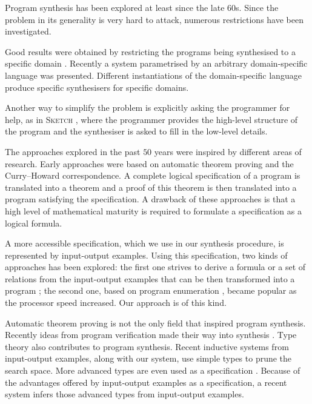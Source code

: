 Program synthesis has been explored at least since the late 60s. Since the problem in its generality is very hard to attack, numerous restrictions have been investigated.

Good results were obtained by restricting the programs being synthesised to a specific domain \cite{Fischer:2003:ASG:967842.967845,Frigo98fftw:an,Thies2002,Gulwani:2011:ASP:1926385.1926423,Gulwani:2011:SGC:1993498.1993505}. Recently a system parametrised by an arbitrary domain-specific language \cite{Perelman:2014:TS:2594291.2594297} was presented. Different instantiations of the domain-specific language produce specific synthesisers for specific domains.

Another way to simplify the problem is explicitly asking the programmer for help, as in \textsc{Sketch} \cite{Solar-Lezama:2006:CSF:1168857.1168907}, where the programmer provides the high-level structure of the program and the synthesiser is asked to fill in the low-level details.

The approaches explored in the past $50$ years were inspired by different areas of research.
Early approaches \cite{Manna:1980:DAP:357084.357090} were based on automatic theorem proving and the Curry–Howard correspondence. A complete logical specification of a program is translated into a theorem and a proof of this theorem is then translated into a program satisfying the specification.
A drawback of these approaches is that a high level of mathematical maturity is required to formulate a specification as a logical formula.

A more accessible specification, which we use in our synthesis procedure, is represented by input-output examples. Using this specification, two kinds of approaches has been explored: the first one strives to derive a formula or a set of relations from the input-output examples that can be then transformed into a program \cite{Summers:1977:MLP:321992.322002,Kitzelmann:2009:AIF:1530575.1530582,Jha:2010:OCP:1806799.1806833}; the second one, based on program enumeration  \cite{LambdaSquarePaper,EscherPaper,MythPaper}, became popular as the processor speed increased. Our approach is of this kind.

Automatic theorem proving is not the only field that inspired program synthesis. Recently ideas from program verification made their way into synthesis \cite{LeonPaper,DBLP:journals/corr/InalaQLS15,Kuncak:2010:CFS:1806596.1806632}. Type theory also contributes to program synthesis. Recent inductive systems from input-output examples, \cite{LambdaSquarePaper,MythPaper} along with our system, use simple types to prune the search space. More advanced types are even used as a specification \cite{SynquidPaper}. Because of the advantages offered by input-output examples as a specification, a recent system \cite{Frankle:2016:EST:2837614.2837629} infers those advanced types from input-output examples.

